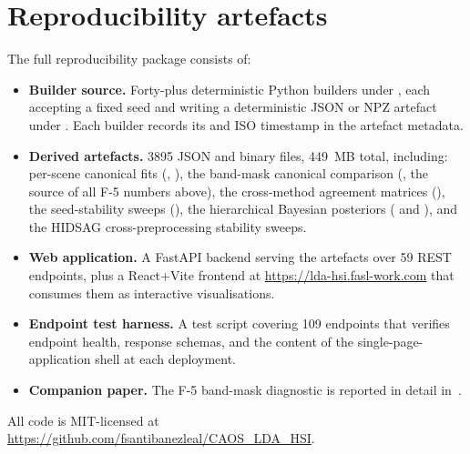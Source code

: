 \documentclass[journal,a4paper,10pt]{IEEEtran}
\begin{document}
\section{Reproducibility artefacts}
\label{sec:repro}

The full reproducibility package consists of:

{\raggedright
\begin{itemize}
\item \textbf{Builder source.} Forty-plus deterministic Python
builders under , each accepting a
fixed seed and writing a deterministic JSON or NPZ artefact under
. Each builder records its
 and  ISO timestamp in
the artefact metadata.
\item \textbf{Derived artefacts.} 3895 JSON and binary files,
449~MB total, including: per-scene canonical fits
(, ), the
band-mask canonical comparison
(, the source of all
F-5 numbers above), the cross-method agreement matrices
(), the seed-stability sweeps
(), the hierarchical Bayesian
posteriors
(
and ),
and the HIDSAG cross-preprocessing stability sweeps.
\item \textbf{Web application.} A FastAPI backend serving the
artefacts over 59 REST endpoints, plus a React+Vite frontend at
\url{https://lda-hsi.fasl-work.com} that consumes them as interactive
visualisations.
\item \textbf{Endpoint test harness.} A test script covering 109
endpoints that verifies endpoint health, response schemas, and the
content of the single-page-application shell at each deployment.
\item \textbf{Companion paper.} The F-5 band-mask diagnostic is reported
in detail in~\cite{santibanezleal2026bandmask}.
\end{itemize}
\par}

All code is MIT-licensed at
\url{https://github.com/fsantibanezleal/CAOS_LDA_HSI}.

\end{document}
